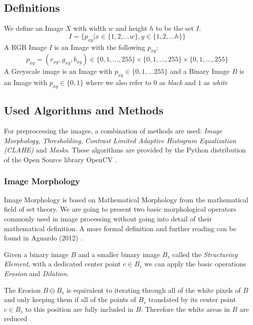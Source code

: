 \documentclass[serif,article,noparskip]{agse-thesis}
\begin{document}
\subsection{Definitions} \label{definitions}

We define an Image $X$ with width $w$ and height $h$ to be the set $I$.
$$I = \{p_{xy} | x \in \{1,2, \dots w\}, y \in \{1,2, \dots h\} \}$$
A RGB Image $I$ is an Image with the following  $p_{xy}$: $$p_{xy} = (r_{xy}, g_{xy}, b_{xy}) \in \{0,1,...,255\} \times
\{0,1,...,255\} \times\{0,1,...,255\}$$ A Greyscale image is an Image with
$p_{xy} \in \{0,1, \dots 255\}$ and a Binary Image $B$ is an Image with $p_{xy} \in \{0,1\}$ where we also refer to
$0$ as \textit{black} and $1$ as \textit{white}

\subsection{Used Algorithms and Methods} \label{used}

For preprocessing the images, a combination of methods are used: \textit{Image
Morphology}, \textit{Thresholding}, \textit{Contrast Limited Adaptive Histogram
Equalization (CLAHE)} and \textit{Masks}. These algorithms are provided by the
Python distribution of the Open Source library OpenCV \cite{opencv_library}.

\subsubsection{Image Morphology}

Image Morphology is based on Mathematical Morphology from the mathematical field
of set theory. We are going to present two basic morphological operators
commonly used in image processing without going into detail of their
mathematical definition. A more formal definition and further reading can be
found in Aguardo (2012) \cite{Aguardo2012}.

Given a binary image $B$ and a smaller binary image $B_s$ called the
\textit{Structuring Element}, with a dedicated center point $c \in B_s$ we can
apply the basic operations \textit{Erosion} and \textit{Dilation}.


The Erosion $B \ominus B_s$ is equivalent to iterating through all of the white
pixels of $B$ and only keeping them if all of the points of $B_s$ translated
by its center point $c \in B_s$ to this position are fully included in $B$.
Therefore the white areas in $B$ are reduced . \cite{Smith1997}
\end{document}
